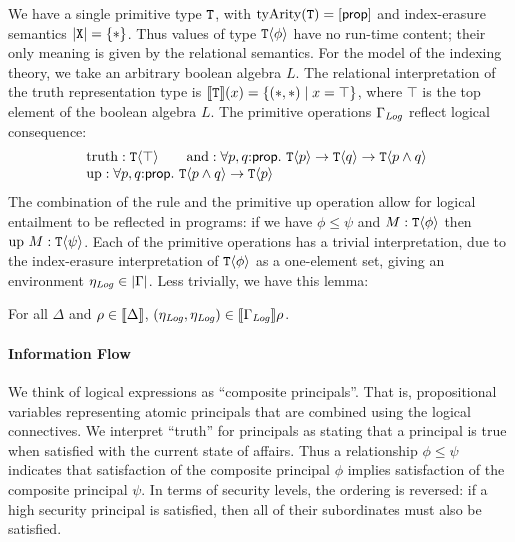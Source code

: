 We have a single primitive type $\textup{\texttt{T}}$, with
$\mathrm{tyArity}(\textup{\texttt{T}}) = [\mathsf{prop}]$ and index-erasure
semantics $\left| \textup{\texttt{X}}\right| = \{ * \}$. Thus values of type
$\textup{\texttt{T}}\langle \phi \rangle$ have no run-time content; their only meaning is
given by the relational semantics. For the model of the indexing
theory, we take an arbitrary boolean algebra $L$. The relational
interpretation of the truth representation type is
$\llbracket \textup{\texttt{T}} \rrbracket(x) = \{ (*,*) \mathrel| x = \top \}$, where $\top$
is the top element of the boolean algebra $L$. The primitive
operations $\Gamma_{\mathit{Log}}$ reflect logical consequence:
\begin{displaymath}
  \begin{array}{l}
  \begin{array}{@{}c@{\hspace{2em}}c}
    \mathrm{truth} : \tyPrim{T}{\top} &
    \mathrm{and}   : \forall p, q\mathord:\mathsf{prop}.\ \tyPrim{T}{p} \to \tyPrim{T}{q} \to \tyPrim{T}{p \land q}
  \end{array} \\
  \mathrm{up} : \forall p, q\mathord:\mathsf{prop}.\ \tyPrim{T}{p \land q} \to \tyPrim{T}{p}
\end{array}
\end{displaymath}
The combination of the  rule and the primitive
$\mathrm{up}$ operation allow for logical entailment to be reflected
in programs: if we have $\phi \leq \psi$ and $M : \textup{\texttt{T}}\langle \phi \rangle$
then $\mathrm{up}\ M : \textup{\texttt{T}}\langle \psi \rangle$. Each of the primitive
operations has a trivial interpretation, due to the index-erasure
interpretation of $\textup{\texttt{T}}\langle \phi \rangle$ as a one-element set, giving an
environment $\eta_{\mathit{Log}} \in \left| \Gamma\right|$. Less trivially, we
have this lemma:
\begin{lemma}\label{lem:environments-information-flow}
  For all $\Delta$ and $\rho \in \llbracket \Delta \rrbracket$, $(\eta_{\mathit{Log}}, \eta_{\mathit{Log}}) \in \llbracket \Gamma_{\mathit{Log}} \rrbracket\rho$.
\end{lemma}

\paragraph{Information Flow} We think of logical expressions as
``composite principals''. That is, propositional variables representing
atomic principals that are combined using the logical connectives. We
interpret ``truth'' for principals as stating that a principal is true
when satisfied with the current state of affairs. Thus a relationship
$\phi \leq \psi$ indicates that satisfaction of the composite
principal $\phi$ implies satisfaction of the composite principal
$\psi$. In terms of security levels, the ordering is reversed: if a
high security principal is satisfied, then all of their subordinates
must also be satisfied.

